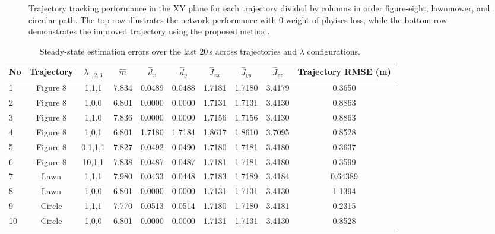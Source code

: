 \begin{figure}[htbp]
    \caption{Trajectory tracking performance in the XY plane for each trajectory divided by columns in order figure-eight, lawnmower, and circular path. The top row illustrates the network performance with 0 weight of phyiscs loss, while the bottom row demonstrates the improved trajectory using the proposed method.}
    \label{fig:combined_states}
\end{figure}


\begin{table}[htbp]
    \centering
    \caption{Steady-state estimation errors over the last 20\,s across trajectories and $\lambda$ configurations.}
    \label{tab:ep_res_all}
    \begin{tabular}{lccccccccc}
        \hline
        \rule{0pt}{2.5ex}No & Trajectory & $\lambda_{1,2,3}$ & $\hat{m}$ & $\hat{d}_x$ & $\hat{d}_y$ & $\hat{J}_{xx}$ & $\hat{J}_{yy}$ & $\hat{J}_{zz}$ & Trajectory RMSE (m) \\
        \hline
        \rule{0pt}{2.5ex}1 & Figure 8  & 1,1,1 & 7.834 & 0.0489 & 0.0488 & 1.7181 & 1.7180 & 3.4179 & 0.3650 \\
        2 & Figure 8  & 1,0,0 & 6.801 & 0.0000 & 0.0000 & 1.7131 & 1.7131 & 3.4130 & 0.8863 \\
        3 & Figure 8 & 1,1,0 & 7.836 & 0.0000 & 0.0000 & 1.7156 & 1.7156 & 3.4130 & 0.8863 \\
        4 & Figure 8 & 1,0,1 & 6.801 & 1.7180 & 1.7184 & 1.8617 & 1.8610 & 3.7095 & 0.8528 \\
        5 & Figure 8 & 0.1,1,1 & 7.827 & 0.0492 & 0.0490 & 1.7180 & 1.7181 & 3.4180 & 0.3637 \\
        6 & Figure 8 & 10,1,1 & 7.838 & 0.0487 & 0.0487 & 1.7181 & 1.7181 & 3.4180 & 0.3599 \\
        7 & Lawn & 1,1,1 & 7.980 & 0.0433 & 0.0448 & 1.7183 & 1.7189 & 3.4184 & 0.64389 \\
        8 & Lawn & 1,0,0 & 6.801 & 0.0000 & 0.0000 & 1.7131 & 1.7131 & 3.4130 & 1.1394 \\
        9 & Circle & 1,1,1 & 7.770 & 0.0513 & 0.0514 & 1.7180 & 1.7180 & 3.4181 & 0.2315 \\
        10 & Circle & 1,0,0 & 6.801 & 0.0000 & 0.0000 & 1.7131 & 1.7131 & 3.4130 & 0.8528 \\
        \hline
    \end{tabular}
\end{table}

